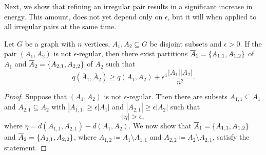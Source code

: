         Next, we show that refining an irregular pair results in a significant increase in energy.
        This amount, does not yet depend only on $\epsilon$, but it will when applied to all irregular pairs
        at the same time.
        \begin{lemma} \label{lem:increase_in_energy_when_refining_an_irregular_pair}
            Let $G$ be a graph with $n$ vertices, $A_1, A_2 \subseteq G$ be disjoint subsets and $\epsilon > 0$.
            If the pair $(A_1, A_2)$ is not $\epsilon$-regular, then there exist partitions
            $\overline{A}_1 = \{ A_{1,1}, A_{1,2} \}$ of $A_1$ and
            $\overline{A}_2 = \{ A_{2,1}, A_{2,2} \}$ of $A_2$ such that
            \[
                q(\overline{A}_1, \overline{A}_2) \geq q(A_1, A_2) + \epsilon^4 \frac{|A_1||A_2|}{n^2}.
            \]
            \begin{proof}
                Suppose that $(A_1, A_2)$ is not $\epsilon$-regular.
                Then there are subsets $A_{1,1} \subseteq A_1$ and $A_{2,1} \subseteq A_2$ with
                $|A_{1,1}| \geq \epsilon |A_1|$ and $|A_{2,1}| \geq \epsilon |A_2|$ such that
                \begin{equation} \label{eq:irregular_pair_density_difference}
                    |\eta| > \epsilon,
                \end{equation}
                where $\eta = d(A_{1,1}, A_{2,1}) - d(A_1, A_2)$.
                We now show that $\overline{A}_1 = \{ A_{1,1}, A_{1,2} \}$ and
                $\overline{A}_2 = \{ A_{2,1}, A_{2,2} \}$, where $A_{1,2} \coloneqq A_1 \setminus A_{1,1}$ and
                $A_{2,2} \coloneqq A_2 \setminus A_{2,1}$, satisfy the statement.


\end{proof}
\end{lemma}

